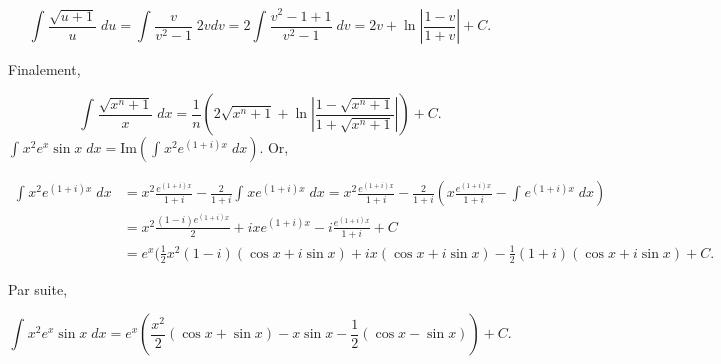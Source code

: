 {{$$\int_{}^{}\frac{\sqrt{u+1}}{u}\;du=\int_{}^{}\frac{v}{v^2-1}\;2vdv=2\int_{}^{}\frac{v^2-1+1}{v^2-1}\;dv
=2v+\ln\left|\frac{1-v}{1+v}\right|+C.$$

Finalement,

$$\int_{}^{}\frac{\sqrt{x^n+1}}{x}\;dx=\frac{1}{n}(2\sqrt{x^n+1}+\ln\left|
\frac{1-\sqrt{x^n+1}}{1+\sqrt{x^n+1}}\right|)+C.$$
$\int_{}^{}x^2e^x\sin x\;dx=\mbox{Im}(\int_{}^{}x^2e^{(1+i)x}\;dx)$. Or,

\begin{align*}
\int_{}^{}x^2e^{(1+i)x}\;dx&=x^2\frac{e^{(1+i)x}}{1+i}-\frac{2}{1+i}\int_{}^{}xe^{(1+i)x}\;dx
=x^2\frac{e^{(1+i)x}}{1+i}-\frac{2}{1+i}(x\frac{e^{(1+i)x}}{1+i}-\int_{}^{}e^{(1+i)x}\;dx)\\
 &=x^2\frac{(1-i)e^{(1+i)x}}{2}+ixe^{(1+i)x}-i\frac{e^{(1+i)x}}{1+i}+C\\
 &=e^x(\frac{1}{2}x^2(1-i)(\cos x+i\sin x)+ix(\cos x+i\sin x)-\frac{1}{2}(1+i)(\cos x+i\sin x)+C.
\end{align*}

Par suite,

$$\int_{}^{}x^2e^x\sin x\;dx=e^x(\frac{x^2}{2}(\cos x+\sin x)-x\sin x-\frac{1}{2}(\cos x-\sin x))+C.$$
}
}
